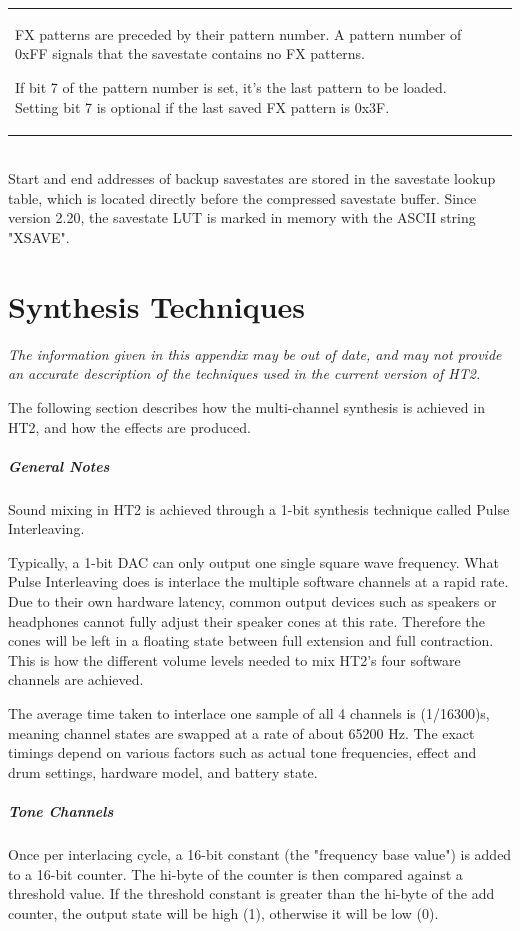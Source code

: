 \documentclass[12pt]{report}	%
\begin{document}
\begin{appendices}
\begin{tabularx}{\textwidth}{p{} p{} X}
FX patterns are preceded by their pattern number. A pattern number of 0xFF signals that the savestate contains no FX patterns.

If bit 7 of the pattern number is set, it's the last pattern to be loaded. Setting bit 7 is optional if the last saved FX pattern is 0x3F. \\
\end{tabularx} ~\\

Start and end addresses of backup savestates are stored in the savestate lookup table, which is located directly before the compressed savestate buffer. Since version 2.20, the savestate LUT is marked in memory with the ASCII string "XSAVE".




\chapter{Synthesis Techniques}
\label{sec:synthtec}
\emph{The information given in this appendix may be out of date, and may not provide an accurate description of the techniques used in the current version of HT2.}

The following section describes how the multi-channel synthesis is achieved in HT2, and how the effects are produced.

\paragraph{General Notes} Sound mixing in HT2 is achieved through a 1-bit synthesis technique called Pulse Interleaving.

Typically, a 1-bit DAC can only output one single square wave frequency. What Pulse Interleaving does is interlace the multiple software channels at a rapid rate. Due to their own hardware latency, common output devices such as speakers or headphones cannot fully adjust their speaker cones at this rate. Therefore the cones will be left in a floating state between full extension and full contraction. This is how the different volume levels needed to mix HT2's four software channels are achieved.

The average time taken to interlace one sample of all 4 channels is (1/16300)s, meaning channel states are swapped at a rate of about 65200 Hz. The exact timings depend on various factors such as actual tone frequencies, effect and drum settings, hardware model, and battery state.


\paragraph{Tone Channels} Once per interlacing cycle, a 16-bit constant (the "frequency base value") is added to a 16-bit counter. The hi-byte of the counter is then compared against a threshold value. If the threshold constant is greater than the hi-byte of the add counter, the output state will be high (1), otherwise it will be low (0).


\end{appendices}
\end{document}
